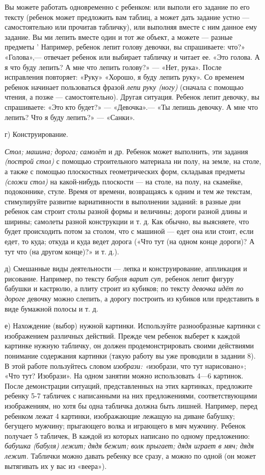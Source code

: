 \documentclass[a5paper]{book}
\renewcommand{\emph}[1]{\textit{#1}}
\begin{document}
Вы можете работать одновременно с ребенком: или выполи его задание по
его тексту (ребенок может предложить вам таблиц, а может дать задание
устно --- самостоятельно или прочитав табличку), или выполняя вместе с
ним данное ему задание. Вы ми лепить вместе один и тот же объект, а
можете --- разные предметы ' Например, ребенок лепит голову девочки, вы
спрашиваете: что?» «Голова»,--- отвечает ребенок или выбирает табличку и
читает ее. «Это голова. А я что буду лепить? А мне что лепить голову?»
--- «Нет, рука». После исправления повторяет: «Руку» «Хорошо, я буду
лепить руку». Со временем ребенок начинает пользоваться фразой
\emph{лепи руку (ногу)} (сначала с помощью чтения, а позже ---
самостоятельно). Другая ситуация. Ребенок лепит девочку, вы спрашиваете:
«Это кто будет?» --- «Девочка».--- «Ты лепишь девочку. А мне что лепить?
Что я буду лепить?» --- «Санки».

г) Конструирование.

\emph{Стол; машина; дорога; самолёт} и др. Ребенок может выполнить, эти
задания \emph{(построй стол)} с помощью строительного материала ни полу,
на земле, на столе, а также с помощью плоскостных геометрических форм,
складывая предметы \emph{(сложи стол)} на какой-нибудь плоскости --- на
столе, на полу, на скамейке, подоконнике, стуле. Время от времени,
возвращаясь к одним и тем же текстам, стимулируйте развитие
вариативности в выполнении заданий: в разные дни ребенок сам строит
столы разной формы и величины; дороги разной длины и ширины; самолеты
разной конструкции и т. д. Как обычно, вы выясняете, что будет
происходить потом за столом, что с машиной --- едет она или стоит, если
едет, то куда; откуда и куда ведет дорога («Что тут (на одном конце
дороги)? А тут что (на другом конце)?» и т. д.).

д) Смешанные виды деятельности --- лепка и конструирование, аппликация и
рисование. Например, по тексту \emph{бабуля варит суп,} ребенок лепит
фигуру бабушки и кастрюлю, а плиту строит из кубиков; по тексту
\emph{девочка идёт по дороге} девочку можно слепить, а дорогу построить
из кубиков или представить в виде бумажной полосы и т. д.

е) Нахождение (выбор) нужной картинки. Используйте разнообразные
картинки с изображением различных действий. Прежде чем ребенок выберет к
каждой картинке нужную табличку, он должен продемонстрировать своими
действиями понимание содержания картинки (такую работу вы уже проводили
в задании 8). В этой работе пользуйтесь словом \emph{изобрази:
«}изобрази, что тут нарисовано»; «Что тут? Изобрази». На одном занятии
можно использовать 4---6 картинок. После демонстрации ситуаций,
представленных на этих картинках, предложите ребенку 5-7 табличек с
написанными на них предложениями, соответствующими изображениям, но хотя
бы одна табличка должна быть лишней. Например, перед ребенком лежат 4
картинки, изображающие лежащую на диване бабушку; бегущего мужчину;
прыгающего волка и играющего в мяч мужчину. Ребенок получает 5 табличек,
В каждой из которых написано по одному предложению: \emph{бабушка
(бабуля) лежит; дядя бежит; волк прыгает; дядя играет в мяч; дядя
лежит.} Таблички можно давать ребенку все сразу, а можно по одной (он
может вытягивать их у вас из «веера»).
\end{document}
